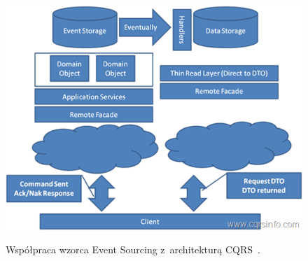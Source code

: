 \begin{figure}[!ht]
 \begin{center}
  \scalebox{0.6}
  {
   \includegraphics{figures/generated_app_type/cqrs_es.png}
  }
 \end{center}
 \caption{Współpraca wzorca Event Sourcing z~architekturą CQRS~\cite{cqrs_info}.}
 \label{fig:cqrs_es}
\end{figure}
